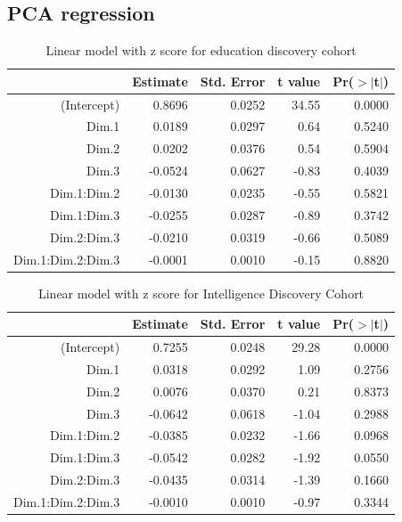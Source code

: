 \subsection{PCA regression}
\begin{table}[ht]
\centering
\begin{tabular}{rrrrr}
  \hline
 & Estimate & Std. Error & t value & Pr($>$$|$t$|$) \\ 
  \hline
(Intercept) & 0.8696 & 0.0252 & 34.55 & 0.0000 \\ 
  Dim.1 & 0.0189 & 0.0297 & 0.64 & 0.5240 \\ 
  Dim.2 & 0.0202 & 0.0376 & 0.54 & 0.5904 \\ 
  Dim.3 & -0.0524 & 0.0627 & -0.83 & 0.4039 \\ 
  Dim.1:Dim.2 & -0.0130 & 0.0235 & -0.55 & 0.5821 \\ 
  Dim.1:Dim.3 & -0.0255 & 0.0287 & -0.89 & 0.3742 \\ 
  Dim.2:Dim.3 & -0.0210 & 0.0319 & -0.66 & 0.5089 \\ 
  Dim.1:Dim.2:Dim.3 & -0.0001 & 0.0010 & -0.15 & 0.8820 \\ 
   \hline
\end{tabular}
\caption{Linear model with z score for education discovery cohort}
\end{table}


\begin{table}[ht]
\centering
\begin{tabular}{rrrrr}
  \hline
 & Estimate & Std. Error & t value & Pr($>$$|$t$|$) \\ 
  \hline
(Intercept) & 0.7255 & 0.0248 & 29.28 & 0.0000 \\ 
  Dim.1 & 0.0318 & 0.0292 & 1.09 & 0.2756 \\ 
  Dim.2 & 0.0076 & 0.0370 & 0.21 & 0.8373 \\ 
  Dim.3 & -0.0642 & 0.0618 & -1.04 & 0.2988 \\ 
  Dim.1:Dim.2 & -0.0385 & 0.0232 & -1.66 & 0.0968 \\ 
  Dim.1:Dim.3 & -0.0542 & 0.0282 & -1.92 & 0.0550 \\ 
  Dim.2:Dim.3 & -0.0435 & 0.0314 & -1.39 & 0.1660 \\ 
  Dim.1:Dim.2:Dim.3 & -0.0010 & 0.0010 & -0.97 & 0.3344 \\ 
   \hline
\end{tabular}
\caption{Linear model with z score for Intelligence Discovery Cohort}
\end{table}



